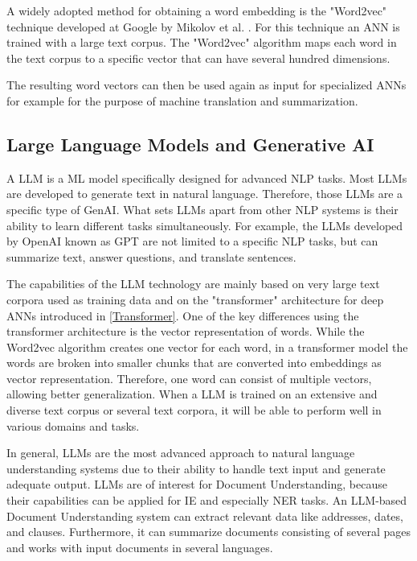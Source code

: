 A widely adopted method for obtaining a word embedding is the "Word2vec" technique developed at Google by Mikolov et al. \cite{mikolov2013}. For this technique an \ac{ANN} is trained with a large text corpus. The "Word2vec" algorithm maps each word in the text corpus to a specific vector that can have several hundred dimensions.

The resulting word vectors can then be used again as input for specialized \acp{ANN} for example for the purpose of machine translation and summarization.


\subsection{Large Language Models and Generative AI}
A \ac{LLM} is a \ac{ML} model specifically designed for advanced \ac{NLP} tasks. Most \acp{LLM} are developed to generate text in natural language. Therefore, those \acp{LLM} are a specific type of \ac{GenAI}. What sets \acp{LLM} apart from other \ac{NLP} systems is their ability to learn different tasks simultaneously. For example, the \acp{LLM} developed by OpenAI known as \ac{GPT} are not limited to a specific \ac{NLP} tasks, but can summarize text, answer questions, and translate sentences.
\cite{radford2019language}

The capabilities of the \ac{LLM} technology are mainly based on very large text corpora used as training data and on the "transformer" architecture for deep \acp{ANN} introduced in \cref{Transformer}. One of the key differences using the transformer architecture is the vector representation of words. While the Word2vec algorithm creates one vector for each word, in a transformer model the words are broken into smaller chunks that are converted into embeddings as vector representation. Therefore, one word can consist of multiple vectors, allowing better generalization.
When a \ac{LLM} is trained on an extensive and diverse text corpus or several text corpora, it will be able to perform well in various domains and tasks.
\cite{radford2019language,brown2020language}

In general, \acp{LLM} are the most advanced approach to natural language understanding systems due to their ability to handle text input and generate adequate output.
\acp{LLM} are of interest for Document Understanding, because their capabilities can be applied for \acf{IE} and especially \acf{NER} tasks. An \ac{LLM}-based Document Understanding system can extract relevant data like addresses, dates, and clauses. Furthermore, it can summarize documents consisting of several pages and works with input documents in several languages.
\cite{brown2020language,carbonell2021named}

